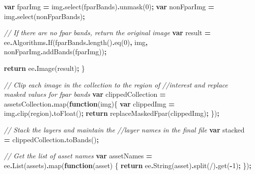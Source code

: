 \documentclass[
  10pt,
  b5paper,
  oneside]{book}
\newenvironment{Shaded}{\begin{snugshade}}{\end{snugshade}}
\newcommand{\AttributeTok}[1]{\textcolor[rgb]{0.77,0.63,0.00}{#1}}
\newcommand{\CommentTok}[1]{\textcolor[rgb]{0.56,0.35,0.01}{\textit{#1}}}
\newcommand{\ControlFlowTok}[1]{\textcolor[rgb]{0.13,0.29,0.53}{\textbf{#1}}}
\newcommand{\DecValTok}[1]{\textcolor[rgb]{0.00,0.00,0.81}{#1}}
\newcommand{\FunctionTok}[1]{\textcolor[rgb]{0.00,0.00,0.00}{#1}}
\newcommand{\KeywordTok}[1]{\textcolor[rgb]{0.13,0.29,0.53}{\textbf{#1}}}
\newcommand{\NormalTok}[1]{#1}
\newcommand{\OperatorTok}[1]{\textcolor[rgb]{0.81,0.36,0.00}{\textbf{#1}}}
\newcommand{\StringTok}[1]{\textcolor[rgb]{0.31,0.60,0.02}{#1}}
\begin{document}
\begin{Shaded}
\begin{Highlighting}[]
  \KeywordTok{var}\NormalTok{ fparImg }\OperatorTok{=}\NormalTok{ img}\OperatorTok{.}\FunctionTok{select}\NormalTok{(fparBands)}\OperatorTok{.}\FunctionTok{unmask}\NormalTok{(}\DecValTok{0}\NormalTok{)}\OperatorTok{;}
  \KeywordTok{var}\NormalTok{ nonFparImg }\OperatorTok{=}\NormalTok{ img}\OperatorTok{.}\FunctionTok{select}\NormalTok{(nonFparBands)}\OperatorTok{;}
  
  \CommentTok{// If there are no fpar bands, return the original image}
  \KeywordTok{var}\NormalTok{ result }\OperatorTok{=}\NormalTok{ ee}\OperatorTok{.}\AttributeTok{Algorithms}\OperatorTok{.}\FunctionTok{If}\NormalTok{(fparBands}\OperatorTok{.}\FunctionTok{length}\NormalTok{()}\OperatorTok{.}\FunctionTok{eq}\NormalTok{(}\DecValTok{0}\NormalTok{)}\OperatorTok{,}
\NormalTok{                                 img}\OperatorTok{,}
\NormalTok{                                 nonFparImg}\OperatorTok{.}\FunctionTok{addBands}\NormalTok{(fparImg))}\OperatorTok{;}
  
  \ControlFlowTok{return}\NormalTok{ ee}\OperatorTok{.}\FunctionTok{Image}\NormalTok{(result)}\OperatorTok{;}
\NormalTok{\}}

\CommentTok{// Clip each image in the collection to the region of }
\CommentTok{//interest and replace masked values for fpar bands}
\KeywordTok{var}\NormalTok{ clippedCollection }\OperatorTok{=}\NormalTok{ assetsCollection}\OperatorTok{.}\FunctionTok{map}\NormalTok{(}\KeywordTok{function}\NormalTok{(img)\{}
  \KeywordTok{var}\NormalTok{ clippedImg }\OperatorTok{=}\NormalTok{ img}\OperatorTok{.}\FunctionTok{clip}\NormalTok{(region)}\OperatorTok{.}\FunctionTok{toFloat}\NormalTok{()}\OperatorTok{;}
  \ControlFlowTok{return} \FunctionTok{replaceMaskedFpar}\NormalTok{(clippedImg)}\OperatorTok{;}
\NormalTok{\})}\OperatorTok{;}

\CommentTok{// Stack the layers and maintain the }
\CommentTok{//layer names in the final file}
\KeywordTok{var}\NormalTok{ stacked }\OperatorTok{=}\NormalTok{ clippedCollection}\OperatorTok{.}\FunctionTok{toBands}\NormalTok{()}\OperatorTok{;}

\CommentTok{// Get the list of asset names}
\KeywordTok{var}\NormalTok{ assetNames }\OperatorTok{=}\NormalTok{ ee}\OperatorTok{.}\FunctionTok{List}\NormalTok{(assets)}\OperatorTok{.}\FunctionTok{map}\NormalTok{(}\KeywordTok{function}\NormalTok{(asset) \{}
  \ControlFlowTok{return}\NormalTok{ ee}\OperatorTok{.}\FunctionTok{String}\NormalTok{(asset)}\OperatorTok{.}\FunctionTok{split}\NormalTok{(}\StringTok{\textquotesingle{}/\textquotesingle{}}\NormalTok{)}\OperatorTok{.}\FunctionTok{get}\NormalTok{(}\OperatorTok{{-}}\DecValTok{1}\NormalTok{)}\OperatorTok{;}
\NormalTok{\})}\OperatorTok{;}


\end{Highlighting}
\end{Shaded}
\end{document}
